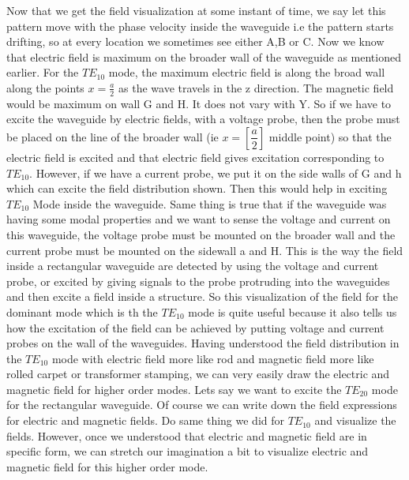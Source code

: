 	Now that we get the field visualization at some instant of time, we say let this pattern move with the phase velocity inside the waveguide i.e the pattern starts drifting, so at every location we sometimes see either A,B or C. Now we know that electric field is maximum on the broader wall of the waveguide as mentioned earlier. For the $TE_{10}$ mode, the maximum electric field is along the broad wall along the points   $x = \frac{a}{2}$ as the wave travels in the z direction. The magnetic field would be maximum on wall G and H. It does not vary with Y. So if we have to excite the waveguide by electric fields, with a voltage probe, then the probe must be placed on the line of the broader wall (ie $x = [\dfrac{a}{2}]$ middle point) so that the electric field is excited and that electric field gives excitation corresponding to $TE_{10}$. However, if we have a current probe, we put it on the side walls of G and h which can excite the field distribution shown. Then this would help in exciting $TE_{10}$ Mode inside the waveguide. Same thing is true that if the waveguide was having some modal properties and we want to sense the voltage and current on this waveguide, the voltage probe must be mounted on the broader wall and the current probe must be mounted on the sidewall a and H. This is the way the field inside a rectangular waveguide are detected by using the voltage and current probe, or excited by giving signals to the probe protruding into the waveguides and then excite a field inside a structure.\newline
	So this visualization of the field for the dominant mode  which is th the $TE_{10}$ mode is quite useful because it also tells us how the excitation of the field can be achieved by putting voltage and current probes on the wall of the waveguides. Having understood the field distribution in the  $TE_{10}$ mode with electric field more like rod and magnetic field more like rolled carpet or transformer stamping, we can very easily draw the electric and magnetic field for higher order modes. Lets say we want to excite the $TE_{20}$ mode for the rectangular waveguide.\newline
	Of course we can write down the field expressions for electric and magnetic fields. Do same thing we did for $TE_{10}$ and visualize the fields. However, once we understood that electric and magnetic field are in specific form, we can stretch our imagination a bit to visualize electric and magnetic field for this higher order mode.\newline 
